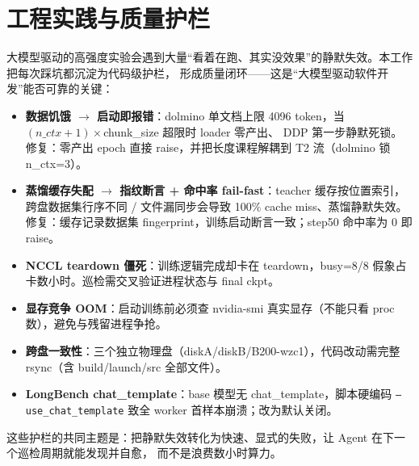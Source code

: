 \documentclass[11pt,a4paper]{ctexart}
\begin{document}
\section{工程实践与质量护栏}
大模型驱动的高强度实验会遇到大量“看着在跑、其实没效果”的静默失效。本工作把每次踩坑都沉淀为代码级护栏，
形成质量闭环——这是“大模型驱动软件开发”能否可靠的关键：
\begin{itemize}
  \item \textbf{数据饥饿 $\to$ 启动即报错}：dolmino 单文档上限 4096 token，当 $(n\_ctx+1)\times$chunk\_size 超限时 loader 零产出、
        DDP 第一步静默死锁。修复：零产出 epoch 直接 raise，并把长度课程解耦到 T2 流（dolmino 锁 n\_ctx=3）。
  \item \textbf{蒸馏缓存失配 $\to$ 指纹断言 + 命中率 fail-fast}：teacher 缓存按位置索引，跨盘数据集行序不同 / 文件漏同步会导致
        100\% cache miss、蒸馏静默失效。修复：缓存记录数据集 fingerprint，训练启动断言一致；step50 命中率为 0 即 raise。
  \item \textbf{NCCL teardown 僵死}：训练逻辑完成却卡在 teardown，busy=8/8 假象占卡数小时。巡检需交叉验证进程状态与 final ckpt。
  \item \textbf{显存竞争 OOM}：启动训练前必须查 nvidia-smi 真实显存（不能只看 proc 数），避免与残留进程争抢。
  \item \textbf{跨盘一致性}：三个独立物理盘（diskA/diskB/B200-wzc1），代码改动需完整 rsync（含 build/launch/src 全部文件）。
  \item \textbf{LongBench chat\_template}：base 模型无 chat\_template，脚本硬编码 \texttt{--use\_chat\_template} 致全 worker 首样本崩溃；改为默认关闭。
\end{itemize}
这些护栏的共同主题是：把静默失效转化为快速、显式的失败，让 Agent 在下一个巡检周期就能发现并自愈，
而不是浪费数小时算力。

\end{document}
